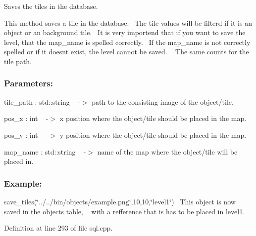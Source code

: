 Saves the tiles in the database. 

This method saves a tile in the database.~\newline
The tile values will be filterd if it is an object or an background tile.~\newline
It is very importend that if you want to save the level, that the map\+\_\+name is spelled correctly.~\newline
If the map\+\_\+name is not correctly spelled or if it doesn\textquotesingle{}t exist, the level cannot be saved. ~\newline
The same counts for the tile path. ~\newline


\subsubsection*{Parameters\+: }

tile\+\_\+path \+: std\+::string ~\newline
-\/$>$ path to the consisting image of the object/tile.

pos\+\_\+x \+: int ~\newline
-\/$>$ x position where the object/tile should be placed in the map.

pos\+\_\+y \+: int ~\newline
-\/$>$ y position where the object/tile should be placed in the map.

map\+\_\+name \+: std\+::string ~\newline
-\/$>$ name of the map where the object/tile will be placed in.

\subsubsection*{Example\+: }

save\+\_\+tiles(\char`\"{}../../bin/objects/example.\+png\char`\"{},10,10,\char`\"{}level1\char`\"{})~\newline
This object is now saved in the objects table, ~\newline
with a refference that is has to be placed in level1.~\newline


Definition at line 293 of file sql.\+cpp.

